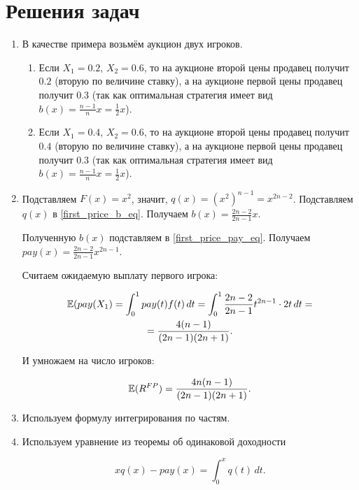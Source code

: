\section{Решения задач}

\begin{enumerate}
\item В качестве примера возьмём аукцион двух игроков.

\begin{enumerate}
\item Если $ X_{1}=0.2 $, $ X_{2}=0.6 $, то на аукционе второй цены продавец получит $ 0.2 $ (вторую по величине ставку), а на аукционе первой цены продавец получит $ 0.3 $ (так как оптимальная стратегия имеет вид $ b(x)=\frac{n-1}{n}x=\frac{1}{2}x $).

\item Если $ X_{1}=0.4 $, $ X_{2}=0.6 $, то на аукционе второй цены продавец получит $ 0.4 $ (вторую по величине ставку), а на аукционе первой цены продавец получит $ 0.3 $ (так как оптимальная стратегия имеет вид $ b(x)=\frac{n-1}{n}x=\frac{1}{2}x $).
\end{enumerate}

\item Подставляем $ F(x)=x^{2} $, значит, $ q(x)=(x^{2})^{n-1}=x^{2n-2} $. Подставляем $ q(x) $ в \ref{first_price_b_eq}. Получаем $ b(x)=\frac{2n-2}{2n-1}x $.

Полученную $ b(x) $ подставляем в \ref{first_price_pay_eq}. Получаем $ pay(x)=\frac{2n-2}{2n-1}x^{2n-1} $.

Считаем ожидаемую выплату первого игрока:

\begin{multline}
\operatorname{\mathbb{E}}(pay(X_{1})=\int_{0}^{1}pay(t)f(t) \, dt=\int_{0}^{1}\frac{2n-2}{2n-1}t^{2n-1}\cdot 2t \, dt=\\
=\frac{4(n-1)}{(2n-1)(2n+1)}.
\end{multline}

И умножаем на число игроков:

\begin{equation}
\operatorname{\mathbb{E}}(R^{FP})=\frac{4n(n-1)}{(2n-1)(2n+1)}.
\end{equation}

\item Используем формулу интегрирования по частям.


\item Используем уравнение из теоремы об одинаковой доходности

\begin{equation}
xq(x)-pay(x)=\int_{0}^{x}q(t) \, dt.
\end{equation}


\end{enumerate}
